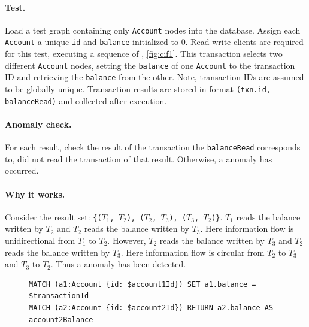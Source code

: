 \paragraph{Test.}
Load a test graph containing only \texttt{Account} nodes into the database.
Assign each \texttt{Account} a unique \texttt{id} and \texttt{balance} 
initialized to 0. Read-write clients are required for this test, executing a 
sequence of , \autoref{fig:cif1}. This transaction 
selects two different \texttt{Account} nodes, setting the \texttt{balance} of 
one \texttt{Account} to the transaction ID and retrieving the \texttt{balance} 
from the other. Note, transaction IDs are assumed to be globally unique. 
Transaction results are stored in format \texttt{(txn.id, balanceRead)} and 
collected after execution.

\paragraph{Anomaly check.}
For each result, check the result of the transaction the \texttt{balanceRead} 
corresponds to, did not read the transaction of that result. Otherwise, a 
 anomaly has occurred.

\paragraph{Why it works.}
Consider the result set:
\texttt{\{($T_\mathrm{1}$, $T_\mathrm{2}$), ($T_\mathrm{2}$, $T_\mathrm{3}$), 
($T_\mathrm{3}$, $T_\mathrm{2}$)\}}. $T_\mathrm{1}$ reads the balance written by
$T_\mathrm{2}$ and $T_\mathrm{2}$ reads the balance written by $T_\mathrm{3}$.
Here information flow is unidirectional from $T_\mathrm{1}$ to $T_\mathrm{2}$.
However, $T_\mathrm{2}$ reads the balance written by $T_\mathrm{3}$ and 
$T_\mathrm{2}$ reads the balance written by $T_\mathrm{3}$. Here information flow 
is circular from $T_\mathrm{2}$ to $T_\mathrm{3}$ and $T_\mathrm{3}$ to $T_\mathrm{2}$.
Thus a  anomaly has been detected.

\begin{figure}[htb]
\begin{lstlisting}[language=cypher,label=fig:cif1,caption=\tx{G1c $T_\mathrm{RW}$}.]
MATCH (a1:Account {id: $account1Id}) SET a1.balance = $transactionId
MATCH (a2:Account {id: $account2Id}) RETURN a2.balance AS account2Balance
\end{lstlisting}
\end{figure}


